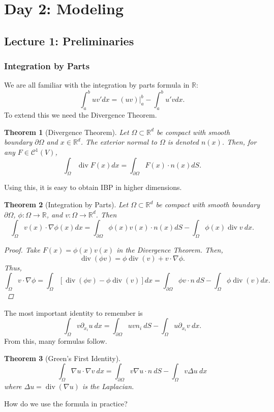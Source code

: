 \documentclass{article}
\newtheorem{theorem}{Theorem}[subsection] %
\theoremstyle{definition}
\theoremstyle{definition}
\newcommand{\R}{\mathbb{R}}
\begin{document}
\section{Day 2: Modeling}
\subsection{Lecture 1: Preliminaries}
\subsubsection{Integration by Parts}
We are all familiar with the integration by parts formula in $\R$:
$$\int_{a}^{b}uv'dx=(uv)\Big|_{a}^{b}-\int_{a}^b u'vdx.$$
To extend this we need the Divergence Theorem.
\begin{theorem}[Divergence Theorem]
Let $\Omega\subset \R^d$ be compact with smooth boundary $\partial \Omega$ and $x\in \R^d$. The exterior normal to $\Omega$ is denoted $n(x)$. Then, for any $F\in \mathcal{C}^1(V)$,
$$\int_{\Omega}\operatorname{div}F(x)dx=\int_{\partial \Omega}F(x)\cdot n(x)dS.$$
\end{theorem}
Using this, it is easy to obtain IBP in higher dimensions.
\begin{theorem}[Integration by Parts]
    Let $\Omega\subset \R^d$ be compact with smooth boundary $\partial \Omega$, $\phi:\Omega\to \R$, and $v:\Omega\to \R^d$. Then
    $$\int_{\Omega}v(x)\cdot \nabla \phi(x)dx=\int_{\partial \Omega}\phi(x)v(x)\cdot n(x)dS-\int_{\Omega}\phi(x)\operatorname{div}v\:dx.$$
    \begin{proof}
        Take $F(x)=\phi(x)v(x)$ in the Divergence Theorem. Then,
        $$\operatorname{div}(\phi v)=\phi\operatorname{div}(v)+v\cdot \nabla \phi.$$
        Thus,
        $$\int_{\Omega}v\cdot \nabla \phi=\int_{\Omega}\left[\operatorname{div}(\phi v)-\phi\operatorname{div}(v)\right]dx=\int_{\partial \Omega}\phi v\cdot n\:dS-\int_{\Omega}\phi \operatorname{div}(v)dx.$$
    \end{proof}
\end{theorem}
The most important identity to remember is
$$\int_{\Omega}v\partial_{x_i}u\:dx=\int_{\partial \Omega}uvn_i\:dS-\int_{\Omega}u\partial_{x_i}v\:dx.$$
From this, many formulas follow.
\begin{theorem}[Green's First Identity]
    $$\int_{\Omega}\nabla u\cdot \nabla v\:dx=\int_{\partial \Omega}v\nabla u\cdot n\:dS-\int_{\Omega}v\Delta u\:dx$$
    where $\Delta u=\operatorname{div}(\nabla u)$ is the Laplacian.
\end{theorem}
How do we use the formula in practice?
\end{document}
